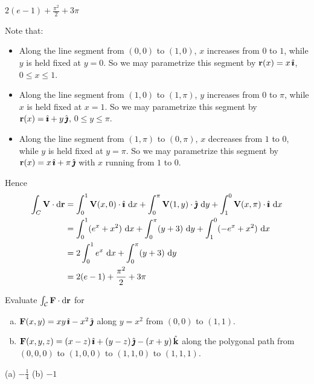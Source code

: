 \begin{answer} 
$2(e-1)+\frac{\pi^2}{2}+3\pi$
\end{answer}

\begin{solution}
Note that:
\begin{itemize}\itemsep1pt \parskip0pt  %
\item
Along the line segment from $(0, 0)$ to $(1,0)$, $x$ increases
from $0$ to $1$, while $y$ is held fixed at $y=0$.
So we may parametrize this segment by $\mathbf{r}(x) = x\,\hat{\pmb{\imath}}$, $0\le x\le 1$.
\item
Along the line segment from $(1, 0)$ to $(1,\pi)$, $y$ increases
from $0$ to $\pi$, while $x$ is held fixed at $x=1$.
So we may parametrize this segment by $\mathbf{r}(x) = \hat{\pmb{\imath}} + y\,\hat{\pmb{\jmath}}$, $0\le y\le\pi$.
\item
Along the line segment from $(1, \pi)$ to $(0,\pi)$, $x$ decreases
from $1$ to $0$, while $y$ is held fixed at $y=\pi$.
So we may parametrize this segment by $\mathbf{r}(x) = x\,\hat{\pmb{\imath}}+\pi\,\hat{\pmb{\jmath}}$
with $x$ running from $1$ to $0$.
\end{itemize}
Hence
\begin{align*}
\int_C \vV\cdot \dee{\vr}
&=\int_0^1 \vV(x,0)\cdot\hi\ \dee{x}+\int_0^\pi \vV(1,y)\cdot\hj\ \dee{y}
+\int_1^0 \vV(x,\pi)\cdot\hi\ \dee{x}\\
&=\int_0^1 (e^x+x^2)\ \dee{x}
         +\int_0^\pi (y+3)\ \dee{y}+\int_1^0 (-e^x+x^2)\ \dee{x}\cr
&=2\int_0^1 e^x\ \dee{x}+\int_0^\pi (y+3)\ \dee{y}\\
&=2(e-1)+\frac{\pi^2}{2}+3\pi
\end{align*}
\end{solution}


\begin{question}
Evaluate $\int_{\mathcal{C}}\mathbf{F}\cdot \mathrm{d}\mathbf{r}$ for 
\begin{enumerate}[(a)]
\item 
$\mathbf{F}(x,y)=xy\,\hat{\pmb{\imath}}-x^2\,\hat{\pmb{\jmath}}$ along $y=x^2$ from $(0,0)$ to $(1,1)$.

\item
$\mathbf{F}(x,y,z)=(x-z)\,\hat{\pmb{\imath}}+(y-z)\,\hat{\pmb{\jmath}}-(x+y)\,\hat{\mathbf{k}}$ along the polygonal path from
$(0,0,0)$ to $(1,0,0)$ to $(1,1,0)$ to $(1,1,1)$.	
\end{enumerate}
\end{question}


\begin{answer}
(a) $-\frac{1}{4}$ \qquad
(b) $-1$	
\end{answer}

